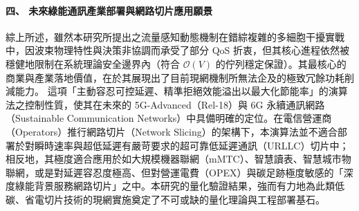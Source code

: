 \paragraph{四、 未來綠能通訊產業部署與網路切片應用願景}
綜上所述，雖然本研究所提出之流量感知動態機制在錯綜複雜的多細胞干擾實戰中，因波束物理特性與決策非協調而承受了部分 QoS 折衷，但其核心進程依然被穩健地限制在系統理論安全邊界內（符合 $\mathcal{O}(V)$ 的佇列穩定保證）。其最核心的商業與產業落地價值，在於其展現出了目前現網機制所無法企及的極致冗餘功耗削減能力。
這項「主動容忍可控延遲、精準拒絕效能溢出以最大化節能率」的演算法之控制性質，使其在未來的 5G-Advanced（Rel-18）與 6G 永續通訊網路（Sustainable Communication Networks）中具備明確的定位。在電信營運商（Operators）推行網路切片（Network Slicing）的架構下，本演算法並不適合部署於對瞬時速率與超低延遲有嚴苛要求的超可靠低延遲通訊（URLLC）切片中；相反地，其極度適合應用於如大規模機器聯網（mMTC）、智慧讀表、智慧城市物聯網，或是對延遲容忍度極高、但對營運電費（OPEX）與碳足跡極度敏感的「深度綠能背景服務網路切片」之中。本研究的量化驗證結果，強而有力地為此類低碳、省電切片技術的現網實施奠定了不可或缺的量化理論與工程部署基石。